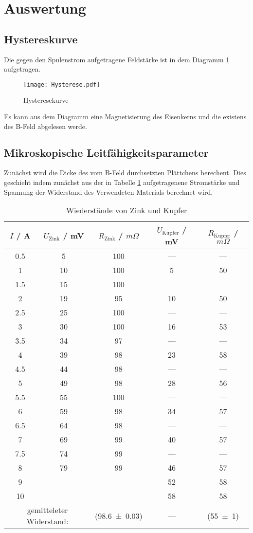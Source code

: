 \section{Auswertung}
\label{sec:Auswertung}
\subsection{Hystereskurve}
Die gegen den Spulenstrom aufgetragene Feldstärke ist in dem Diagramm \ref{fig:Hyst} aufgetragen.
\begin{figure}
  \centering
  \texttt{[image: Hysterese.pdf]}
  \caption{Hysteresekurve}
  \label{fig:Hyst}
\end{figure}
Es kann aus dem Diagramm eine Magnetisierung des Eisenkerns und die existens des B-Feld abgelesen werde.

\subsection{Mikroskopische Leitfähigkeitsparameter}
Zunächst wird die Dicke des vom B-Feld durchsetzten Plättchens berechent. Dies geschieht indem zunächst aus der in Tabelle \ref{tab:RZK} aufgetragenene Stromstärke und Spannung der Widerstand des Verwendeten Materials berechnet wird.
\begin{table}
  \centering
  \begin{tabular}{c|c c|c c}
    \toprule
    $I$ / A & $U_\text{Zink}$ / mV & $R_\text{Zink}$ / $m\Omega$ & $U_\text{Kupfer}$ / mV & $R_\text{Kupfer}$ / $m\Omega$ \\
    \midrule
	0.5	& 5	& 100	& ---	& ---	\\
	1	& 10	& 100	& 5	& 50	\\
	1.5	& 15	& 100	& ---	& ---	\\
	2	& 19	& 95	& 10	& 50	\\
	2.5	& 25	& 100	& ---	& ---	\\
	3	& 30	& 100	& 16 	& 53	\\
	3.5	& 34	& 97	& ---	& ---	\\
	4	& 39	& 98	& 23	& 58	\\
	4.5	& 44	& 98	& ---	& ---	\\
	5	& 49	& 98	& 28	& 56	\\
	5.5	& 55	& 100	& ---	& ---	\\
	6	& 59	& 98	& 34	& 57	\\
	6.5	& 64	& 98	& ---	& ---	\\
	7	& 69	& 99	& 40  	& 57	\\
	7.5	& 74	& 99	& ---	& ---	\\
	8	& 79	& 99	& 46	& 57	\\	
	9	&	&	& 52	& 58	\\
	10	&	&	& 58	& 58	\\
    \midrule
    \multicolumn{2}{c}{gemitteleter Widerstand:}& (\num{98.6 +- 0.03}) & --- & (\num{55 +- 1}) \\
    \bottomrule
  \end{tabular}
  \caption{Wiederstände von Zink und Kupfer}
  \label{tab:RZK}
\end{table} 
